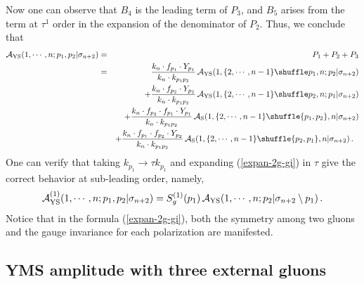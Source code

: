 \documentclass[11pt,a4paper]{article}
\newcommand{\bea}{\begin{eqnarray}}
\newcommand{\eea}{\end{eqnarray}}
\newcommand{\nn}{\nonumber \\}
\def\eref#1{(\ref{#1})}
\begin{document}
Now one can observe that $B_4$ is the leading term of $P_3$, and $B_5$ arises from the term at $\tau^1$ order in the expansion of the denominator of $P_2$. Thus, we conclude that
%
\bea
{\cal A}_{\rm YS}(1,\cdots,n;p_1,p_2|\sigma_{n+2})&=&P_1+P_2+P_3\nn
&=&{k_n\cdot f_{p_1}\cdot Y_{p_1}\over k_n\cdot k_{p_1p_2}}\,{\cal A}_{\rm YS}(1,\{2,\cdots,n-1\}\shuffle p_1,n;p_2|\sigma_{n+2})\nn
& &+{k_n\cdot f_{p_2}\cdot Y_{p_2}\over k_n\cdot k_{p_1p_2}}\,{\cal A}_{\rm YS}(1,\{2,\cdots,n-1\}\shuffle p_2,n;p_1|\sigma_{n+2})\nn
& &+{k_n\cdot f_{p_2}\cdot f_{p_1}\cdot Y_{p_1}\over k_n\cdot k_{p_1p_2}}\,{\cal A}_{\rm S}(1,\{2,\cdots,n-1\}\shuffle \{p_1,p_2\},n|\sigma_{n+2})\nn
& &+{k_n\cdot f_{p_1}\cdot f_{p_2}\cdot Y_{p_2}\over k_n\cdot k_{p_1p_2}}\,{\cal A}_{\rm S}(1,\{2,\cdots,n-1\}\shuffle \{p_2,p_1\},n|\sigma_{n+2})\,.~~\label{expan-2g-gi}
\eea
%
One can verify that taking $k_{p_1}\to\tau k_{p_1}$ and expanding \eref{expan-2g-gi} in $\tau$ give the correct behavior at sub-leading order, namely,
%
\bea
{\cal A}^{(1)}_{\rm YS}(1,\cdots,n;p_1,p_2|\sigma_{n+2})=S^{(1)}_g(p_1)\,{\cal A}_{\rm YS}(1,\cdots,n;p_2|\sigma_{n+2}\setminus p_1)\,.
\eea
%
Notice that in the formula \eref{expan-2g-gi}, both the symmetry among two gluons and the gauge invariance for each polarization are manifested.

\subsection{YMS amplitude with three external gluons}
\label{subsec-3gluon}
\end{document}

